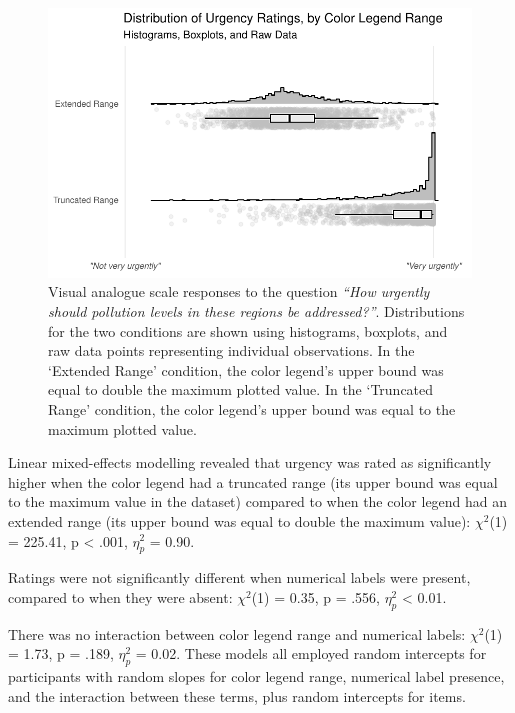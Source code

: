 \documentclass[
]{interact}
\begin{document}
\begin{figure}

{\centering \includegraphics{ChoroplethMagnitude_files/figure-pdf/fig-main-effect-chart-1.pdf}

}

\caption{\label{fig-main-effect-chart}Visual analogue scale responses to
the question \emph{``How urgently should pollution levels in these
regions be addressed?''}. Distributions for the two conditions are shown
using histograms, boxplots, and raw data points representing individual
observations. In the `Extended Range' condition, the color legend's
upper bound was equal to double the maximum plotted value. In the
`Truncated Range' condition, the color legend's upper bound was equal to
the maximum plotted value.}

\end{figure}

Linear mixed-effects modelling revealed that urgency was rated as
significantly higher when the color legend had a truncated range (its
upper bound was equal to the maximum value in the dataset) compared to
when the color legend had an extended range (its upper bound was equal
to double the maximum value): \(\chi^2\)(1) = 225.41, p \textless{}
.001, \(\eta_p^2\) = 0.90.

Ratings were not significantly different when numerical labels were
present, compared to when they were absent: \(\chi^2\)(1) = 0.35, p =
.556, \(\eta_p^2\) \textless{} 0.01.

There was no interaction between color legend range and numerical
labels: \(\chi^2\)(1) = 1.73, p = .189, \(\eta_p^2\) = 0.02. These
models all employed random intercepts for participants with random
slopes for color legend range, numerical label presence, and the
interaction between these terms, plus random intercepts for items.
\end{document}
